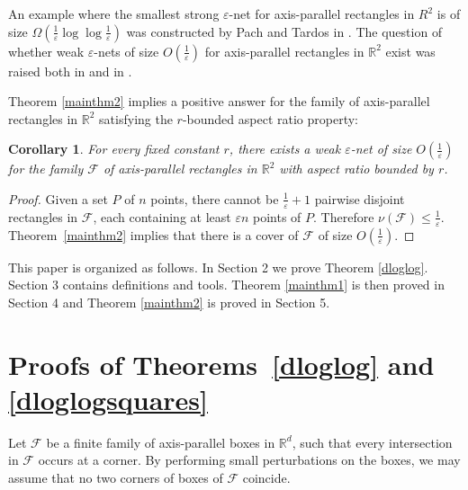 \documentclass[12pt]{amsart}
\theoremstyle{plain}
\newtheorem{corollary}[theorem]{Corollary}
\theoremstyle{definition}
\theoremstyle{remark}
\newcommand{\F}{\mathcal{F}}
\newcommand{\R}{\mathbb{R}}
\newcommand{\e}{\varepsilon}
\begin{document}
An example where the smallest strong $\e$-net for axis-parallel rectangles in $R^2$ is of size $\Omega \left(\frac{1}{\e} \log \log \frac{1}{\e} \right)$ was constructed by Pach and Tardos in \cite{pachtardos}. The question of whether weak $\e$-nets of size $O( \frac{1}{\e})$ for axis-parallel rectangles in $\R^2$ exist was raised both in \cite{aronovezrasharir} and in  \cite{pachtardos}. 

Theorem \ref{mainthm2} implies a positive answer for the family of axis-parallel rectangles in $\R^2$ satisfying the $r$-bounded aspect ratio property: 

\begin{corollary}\label{cor:aspect}
For every fixed constant $r$, there exists a weak $\e$-net of size $O(\frac{1}{\e})$ for the family $\F$ of axis-parallel rectangles in $\R^2$ with aspect ratio bounded by $r$. 
\end{corollary}
\begin{proof}
Given a set $P$ of $n$ points, there cannot be $\frac{1}{\e} + 1$ pairwise disjoint rectangles in $\F$, each containing at least $\e n$ points of $P$. Therefore $\nu(\F) \le \frac{1}{\e}$. Theorem~\ref{mainthm2} implies that there is a cover of $\F$ of size $O(\frac{1}{\e})$. 
\end{proof}

This paper is organized as follows. In Section 2 we prove Theorem \ref{dloglog}. Section 3 contains definitions and tools. Theorem \ref{mainthm1} is then proved in Section 4 and Theorem \ref{mainthm2} is proved in Section 5.

\section{Proofs of Theorems~\ref{dloglog} and \ref{dloglogsquares}}

Let $\F$ be a finite family of axis-parallel boxes in $\R^d$, such that every intersection in $\F$ occurs at a corner. By performing small perturbations on the boxes, we may assume that no two corners of boxes of $\F$ coincide.
\end{document}
